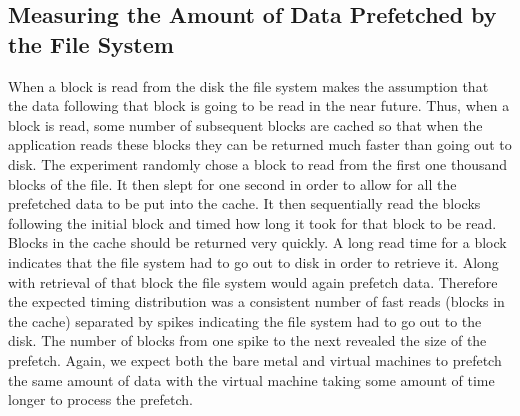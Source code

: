 \documentclass[letterpaper,twocolumn,10pt]{article}
\begin{document}
\subsection{Measuring the Amount of Data Prefetched by the File System}
When a block is read from the disk the file system makes the assumption that the data following that block is going to be read in the near future. 
Thus, when a block is read, some number of subsequent blocks are cached so that when the application reads these blocks they can be returned much faster than going out to disk. 
The experiment randomly chose a block to read from the first one thousand blocks of the file. 
It then slept for one second in order to allow for all the prefetched data to be put into the cache. 
It then sequentially read the blocks following the initial block and timed how long it took for that block to be read. 
Blocks in the cache should be returned very quickly. 
A long read time for a block indicates that the file system had to go out to disk in order to retrieve it. 
Along with retrieval of that block the file system would again prefetch data. 
Therefore the expected timing distribution was a consistent number of fast reads (blocks in the cache) separated by spikes indicating the file system had to go out to the disk. 
The number of blocks from one spike to the next revealed the size of the prefetch.
Again, we expect both the bare metal and virtual machines to prefetch the same amount of data with the virtual machine taking some amount of time longer to process the prefetch.
\end{document}
